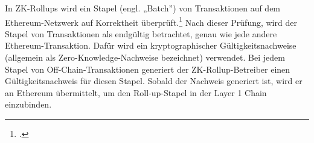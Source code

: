 \begin{itemize}
    \noindent
    In ZK-Rollups wird ein Stapel (engl. „Batch”) von Transaktionen auf dem Ethereum-Netzwerk auf Korrektheit überprüft.\footcite[Vgl. hierzu, zum Folgenden und weiterführend][]{w23}
    Nach dieser Prüfung, wird der Stapel von Transaktionen als endgültig betrachtet, genau wie jede andere Ethereum-Transaktion. Dafür wird ein kryptographischer Gültigkeitsnachweise (allgemein als Zero-Knowledge-Nachweise bezeichnet) verwendet. 
    Bei jedem Stapel von Off-Chain-Transaktionen generiert der ZK-Rollup-Betreiber einen Gültigkeitsnachweis für diesen Stapel. Sobald der Nachweis generiert ist, wird er an Ethereum übermittelt, um den Roll-up-Stapel in der Layer 1 Chain einzubinden.
\end{itemize}

